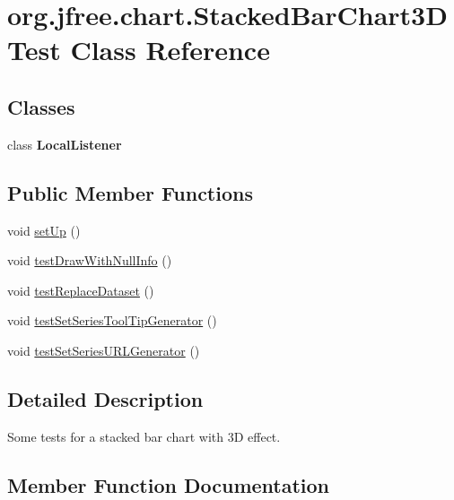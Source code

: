 \hypertarget{classorg_1_1jfree_1_1chart_1_1_stacked_bar_chart3_d_test}{}\section{org.\+jfree.\+chart.\+Stacked\+Bar\+Chart3\+D\+Test Class Reference}
\label{classorg_1_1jfree_1_1chart_1_1_stacked_bar_chart3_d_test}
\subsection*{Classes}
\begin{DoxyCompactItemize}
\item 
class {\bfseries Local\+Listener}
\end{DoxyCompactItemize}
\subsection*{Public Member Functions}
\begin{DoxyCompactItemize}
\item 
void \mbox{\hyperlink{classorg_1_1jfree_1_1chart_1_1_stacked_bar_chart3_d_test_a461f85f73d6850fa711890c633702f68}{set\+Up}} ()
\item 
void \mbox{\hyperlink{classorg_1_1jfree_1_1chart_1_1_stacked_bar_chart3_d_test_a20462120117a3bf590888135c3680134}{test\+Draw\+With\+Null\+Info}} ()
\item 
void \mbox{\hyperlink{classorg_1_1jfree_1_1chart_1_1_stacked_bar_chart3_d_test_abea58ef775e162efa70a745be4b8551a}{test\+Replace\+Dataset}} ()
\item 
void \mbox{\hyperlink{classorg_1_1jfree_1_1chart_1_1_stacked_bar_chart3_d_test_a00148f8fe1cbb792a61c74d391e26c01}{test\+Set\+Series\+Tool\+Tip\+Generator}} ()
\item 
void \mbox{\hyperlink{classorg_1_1jfree_1_1chart_1_1_stacked_bar_chart3_d_test_a7287dacb964113d8d0efb7755dca0195}{test\+Set\+Series\+U\+R\+L\+Generator}} ()
\end{DoxyCompactItemize}


\subsection{Detailed Description}
Some tests for a stacked bar chart with 3D effect. 

\subsection{Member Function Documentation}
\mbox{\label{classorg_1_1jfree_1_1chart_1_1_stacked_bar_chart3_d_test_a461f85f73d6850fa711890c633702f68}} 
